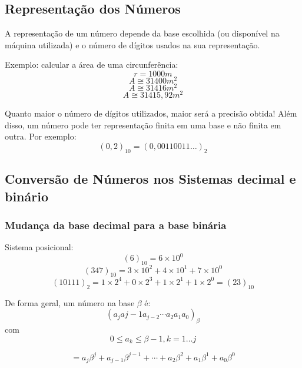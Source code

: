 \documentclass[a4paper,oneside,article,table]{article}
\begin{document}
        \subsection{Representação dos Números}
        A representação de um número depende da base escolhida (ou disponível na máquina utilizada) e o número de dígitos usados na sua representação.

        Exemplo: calcular a área de uma circunferência:
            \[r = 1000 m\]
            \[A \cong 31400 m^2\]
            \[A \cong 31416 m^2\]
            \[A \cong 31415,92 m^2\]

        Quanto maior o número de dígitos utilizados, maior será a precisão obtida! Além disso, um número pode ter representação finita em uma base e não finita em outra. Por exemplo:
        \[{(0,2)}_{10} = {(0,00110011\ldots)}_2\]

        \subsection{Conversão de Números nos Sistemas decimal e binário}
        \subsubsection{Mudança da base decimal para a base binária}
        Sistema posicional:
        \[{(6)}_{10} = 6\times10^0\]
        \[{(347)}_{10} = 3\times10^2 + 4\times10^1 + 7\times10^0\]
        \[{(10111)}_2 = 1\times2^4 + 0\times2^3 + 1\times2^1 + 1\times2^0 = {(23)}_{10}\]

        De forma geral, um número na base $\beta$ é:
        \[{(a_j a{j-1} a_{j-2} \cdots a_2 a_1 a_0)}_{\beta}\] com \[0 \leq a_k \leq \beta - 1, k = 1 \ldots j\]

            \[= a_j\beta^j + a_{j-1}\beta^{j-1} + \cdots + a_2\beta^2 + a_1\beta^1 + a_0\beta^0\]
\end{document}
